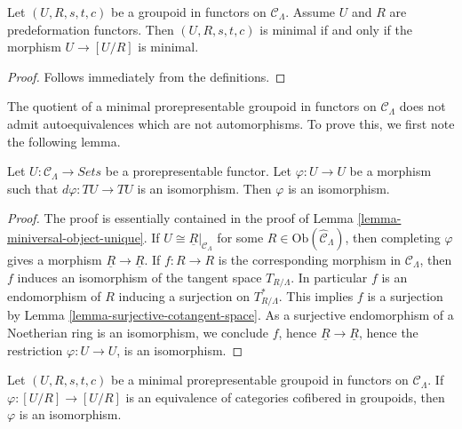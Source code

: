 \begin{lemma}
\label{lemma-characterize-minimal-groupoid-in-functors}
Let $(U, R, s,t,c)$ be a groupoid in functors on $\mathcal{C}_\Lambda$.  
Assume $U$ and $R$ are predeformation functors.  Then $(U,R,s,t,c)$ is minimal 
if and only if the morphism $U \to [U/R]$ is minimal.
\end{lemma}

\begin{proof}
Follows immediately from the definitions.
\end{proof}

\noindent
The quotient of a minimal prorepresentable groupoid in functors on $\mathcal 
C_\Lambda$ does not admit autoequivalences which are not automorphisms.  To 
prove this, we first note the following lemma.

\begin{lemma}
\label{lemma-surjective-morphism-prorepresentable-functor}
Let $U: \mathcal{C}_\Lambda \to \textit{Sets}$ be a 
prorepresentable functor.  Let $\varphi: U \to U$ be a morphism such 
that $d\varphi: TU \to TU$ is an isomorphism.  Then $\varphi$ is an 
isomorphism.
\end{lemma}

\begin{proof}
The proof is essentially contained in the proof of Lemma 
\ref{lemma-miniversal-object-unique}. If $U \cong \underline{R}|_{\mathcal 
C_\Lambda}$ for some $R \in \text{Ob}(\widehat{\mathcal{C}}_\Lambda)$, 
then completing $\varphi$ gives a morphism $\underline{R} \to 
\underline{R}$.  If $f: R \to R$ is the corresponding morphism in 
$\mathcal{C}_\Lambda$, then $f$ induces an isomorphism of the tangent space 
$T_{R/\Lambda}$.  In particular $f$ is an endomorphism of $R$ inducing a 
surjection on $T^*_{R/\Lambda}$.  This implies $f$ is a surjection by Lemma 
\ref{lemma-surjective-cotangent-space}. As a surjective endomorphism of a 
Noetherian ring is an isomorphism, we conclude $f$, hence $\underline{R} 
\to \underline{R}$, hence the restriction $\varphi: U \to U$, 
is an isomorphism.
\end{proof}

\begin{lemma}
\label{lemma-minimal-prorepresentable-groupoid-autoequivalence}
Let $(U,R,s,t,c)$ be a minimal prorepresentable groupoid in functors on 
$\mathcal{C}_\Lambda$.  If $\varphi: [U/R] \to [U/R]$ is an 
equivalence of categories cofibered in groupoids, then $\varphi$ is an 
isomorphism.
\end{lemma}

